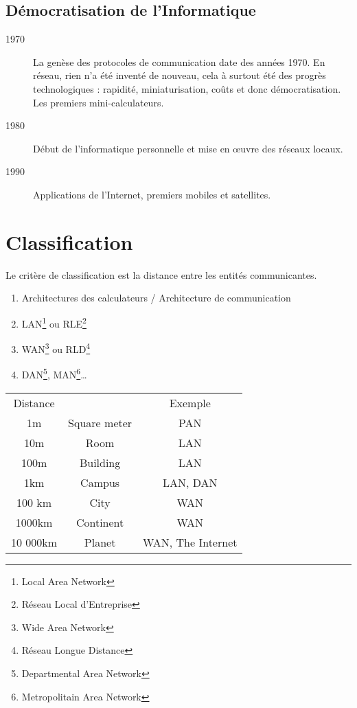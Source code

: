 \documentclass[12pt,a4paper,openany]{book}
\begin{document}
			\section{Démocratisation de l'Informatique}
			\begin{description}
				\item[1970] La genèse des protocoles de communication date des années 1970. En réseau, rien n'a été inventé de nouveau, cela à surtout été des progrès technologiques : rapidité, miniaturisation, coûts et donc démocratisation. Les premiers mini-calculateurs.
				\item[1980] Début de l'informatique personnelle et mise en \oe{}uvre des réseaux locaux.
				\item[1990] Applications de l'Internet, premiers mobiles et satellites. 
			\end{description}

	\chapter{Classification}
		Le critère de classification est la distance entre les entités communicantes.
		\begin{enumerate}
			\item Architectures des calculateurs / Architecture de communication
			\item LAN\footnote{Local Area Network} ou RLE\footnote{Réseau Local d'Entreprise}
			\item WAN\footnote{Wide Area Network} ou RLD\footnote{Réseau Longue Distance}
			\item DAN\footnote{Departmental Area Network}, MAN\footnote{Metropolitain Area Network}\ldots
		\end{enumerate}
		\begin{tabular}{| c c c |}
			\hline
			Distance & & Exemple\\
			1m & Square meter & PAN\\
			\hline
			10m & Room & LAN\\
			\hline
			100m & Building & LAN\\
			\hline
			1km & Campus & LAN, DAN\\
			\hline
			100 km & City & WAN\\
			\hline
			1000km & Continent & WAN\\
			\hline
			10 000km & Planet & WAN, The Internet\\
			\hline
		\end{tabular}
\end{document}
